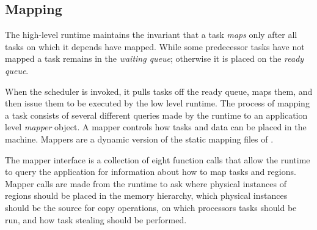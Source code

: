 \subsection{Mapping}
\label{subsec:mapping}
The high-level runtime maintains the invariant that a task {\em maps} only after all tasks on which it depends have mapped. 
While some predecessor tasks have not mapped a task remains in the {\em waiting queue}; otherwise it is placed on the {\em ready queue}.  


When the scheduler is invoked, it pulls tasks off the ready queue, maps them,
and then issue them to be executed by the low level runtime.  The process of mapping a task
consists of several different queries made by the runtime to an application level {\em mapper} object.
A mapper controls how tasks and data can be placed in the machine.  Mappers are a dynamic version of 
the static mapping files of \cite{Fatahalian06}.  

The mapper interface is a collection of eight function calls that allow the runtime to query
the application for information about how to map tasks and regions.  Mapper calls are made
from the runtime to ask where physical instances of regions should be placed in the memory hierarchy,
which physical instances should be the source for copy operations, on which processors
tasks should be run, and how task stealing should be performed.


